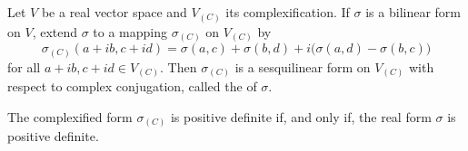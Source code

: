 Let $V$ be a real vector space and $V_{(C)}$ its complexification. If $\sigma$ is a bilinear form on $V$, extend $\sigma$ to a mapping $\sigma_{(C)}$ on $V_{(C)}$ by
$$\sigma_{(C)}(a + ib, c + id) = \sigma(a, c) + \sigma(b, d) + i\bigl(\sigma(a, d) - \sigma(b, c)\bigr)$$
for all $a + ib, c + id \in V_{(C)}$. Then $\sigma_{(C)}$ is a sesquilinear form on $V_{(C)}$ with respect to complex conjugation, called the  of $\sigma$.

The complexified form $\sigma_{(C)}$ is positive definite if, and only if, the real form $\sigma$ is positive definite.
